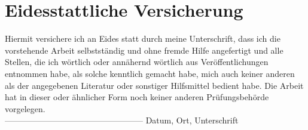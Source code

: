 \documentclass[12pt, oneside]{scrbook}
\begin{document}
	\listoftables
	
	\lstlistoflistings
	\endgroup
	
	\printbibliography[heading=bibintoc, title={Literatur-und Quellenverzeichnis}]

	\newpage
	\thispagestyle{empty}
	
	\section*{Eidesstattliche Versicherung}
	Hiermit versichere ich an Eides statt durch meine Unterschrift, dass ich die vorstehende Arbeit selbstständig und ohne fremde Hilfe angefertigt und alle Stellen, die ich wörtlich oder annähernd wörtlich aus Veröffentlichungen entnommen habe, als solche kenntlich gemacht habe, mich auch keiner anderen als der angegebenen Literatur oder sonstiger Hilfsmittel bedient habe. Die Arbeit hat in dieser oder ähnlicher Form noch keiner anderen Prüfungsbehörde vorgelegen.\\
	\linebreak
	\linebreak
	\linebreak
	\linebreak
	--------------------------------------------------\linebreak
	Datum, Ort, Unterschrift
	
\end{document}

